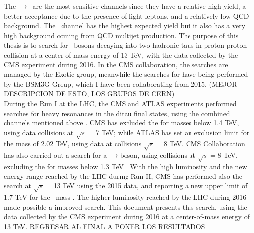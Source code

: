 The \Zprime$\rightarrow$\tauell\tauh~are the most sensitive channels since they have 
a relative high yield, a better acceptance due to the presence of light leptons, and a relatively
low QCD background. The \Zprimetotauh~channel has the highest 
expected yield but it also has a very high background coming 
from QCD multijet production. The purpose of this thesis is to search for \Zprime~bosons decaying into two hadronic taus 
in proton-proton collision at a center-of-mass energy of 13 TeV, with the data collected by the 
CMS  experiment during 2016. In the CMS collaboration, the \Zprime searches 
are managed by the Exotic group, meanwhile the searches for \Zprimetotautau have 
being performed by the BSM3G Group, which I have been collaborating from 2015. (MEJOR DESCRIPCION DE ESTO, LOS GRUPOS DE CERN)\\


During the Run I at the LHC, the CMS and ATLAS experiments performed searches for heavy resonances 
in the ditau final states, using the combined channels mentioned above \cite{CMSZprime2ditaubib,ATLASZprime2ditaubib}.
CMS has excluded the \ZprimeSSM for masses below 1.4 TeV, using data collisions at $\sqrt{s}=$7 TeV; while ATLAS 
has set an exclusion limit for the \ZprimeSSM mass of 2.02 TeV, using data at collisions $\sqrt{s}=$8 TeV. 
CMS Collaboration has also carried out a search for a \Zprime$\rightarrow$\tauetaumu boson, using collisions at $\sqrt{s}=$8 TeV, excluding
the \ZprimeSSM for masses below 1.3 TeV \cite{CMSZprime2ditauelectronmuonbib}. With the high luminosity and the new energy range 
reached by the LHC during Run II, CMS has performed also the \Zprimetotautau search at $\sqrt{s}=$13 TeV using the 2015 data, and reporting 
a new upper limit of 1.7 TeV for the \ZprimeSSM~mass \cite{CMS_Zprime2tays2015}. The higher luminosity reached 
by the LHC during 2016 made possible a improved search. This document presents this search, using 
the data collected by the CMS experiment during 2016 at a center-of-mass energy of 13 TeV. REGRESAR AL FINAL A PONER LOS RESULTADOS\\



